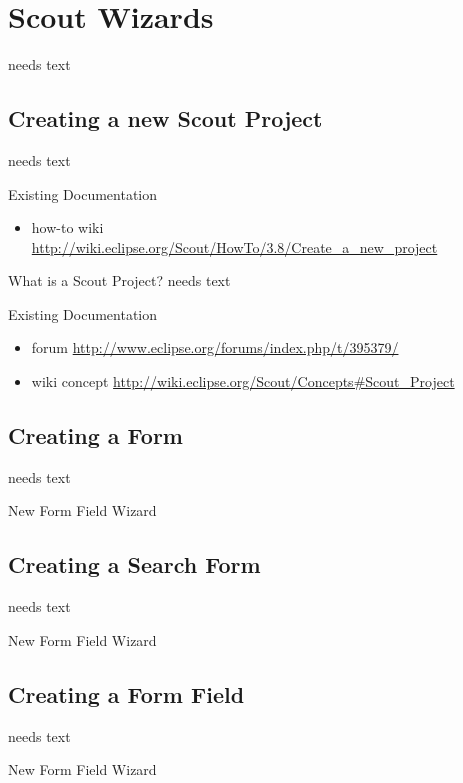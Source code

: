 \documentclass[a4paper,10pt,twoside]{book}
\begin{document}
\section{Scout Wizards}
needs text

\subsection{Creating a new Scout Project}
needs text

\noindent Existing Documentation
\begin{itemize}
  \item how-to wiki \url{http://wiki.eclipse.org/Scout/HowTo/3.8/Create_a_new_project}
\end{itemize}

What is a Scout Project?
needs text

\noindent Existing Documentation
\begin{itemize}
  \item forum \url{http://www.eclipse.org/forums/index.php/t/395379/}
  \item wiki concept \url{http://wiki.eclipse.org/Scout/Concepts#Scout_Project}
\end{itemize}

\subsection{Creating a Form}
needs text

New Form Field Wizard

\subsection{Creating a Search Form}
needs text

New Form Field Wizard

\subsection{Creating a Form Field}
needs text

New Form Field Wizard
\end{document}
